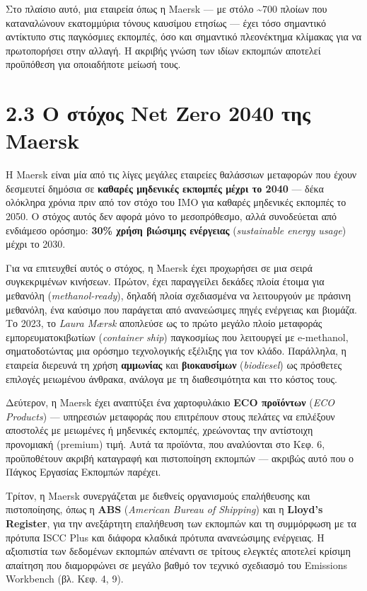 \documentclass[11pt,a4paper,greek,twoside]{template-xe}
\begin{document}
Στο πλαίσιο αυτό, μια εταιρεία όπως η Maersk --- με στόλο
\textasciitilde700 πλοίων που καταναλώνουν εκατομμύρια τόνους καυσίμου
ετησίως --- έχει τόσο σημαντικό αντίκτυπο στις παγκόσμιες εκπομπές, όσο
και σημαντικό πλεονέκτημα κλίμακας για να πρωτοπορήσει στην αλλαγή. Η
ακριβής γνώση των ιδίων εκπομπών αποτελεί προϋπόθεση για οποιαδήποτε
μείωσή τους.

\section{2.3 Ο στόχος Net Zero 2040 της
Maersk}\label{ux3bf-ux3c3ux3c4ux3ccux3c7ux3bfux3c2-net-zero-2040-ux3c4ux3b7ux3c2-maersk}

Η Maersk είναι μία από τις λίγες μεγάλες εταιρείες θαλάσσιων μεταφορών
που έχουν δεσμευτεί δημόσια σε \textbf{καθαρές μηδενικές εκπομπές μέχρι
το 2040} --- δέκα ολόκληρα χρόνια πριν από τον στόχο του IMO για καθαρές
μηδενικές εκπομπές το 2050. Ο στόχος αυτός δεν αφορά μόνο το
μεσοπρόθεσμο, αλλά συνοδεύεται από ενδιάμεσο ορόσημο: \textbf{30\% χρήση
βιώσιμης ενέργειας} (\emph{sustainable energy usage}) μέχρι το 2030.

Για να επιτευχθεί αυτός ο στόχος, η Maersk έχει προχωρήσει σε μια σειρά
συγκεκριμένων κινήσεων. Πρώτον, έχει παραγγείλει δεκάδες πλοία έτοιμα
για μεθανόλη (\emph{methanol-ready}), δηλαδή πλοία σχεδιασμένα να
λειτουργούν με πράσινη μεθανόλη, ένα καύσιμο που παράγεται από
ανανεώσιμες πηγές ενέργειας και βιομάζα. Το 2023, το \emph{Laura Mærsk}
αποπλεύσε ως το πρώτο μεγάλο πλοίο μεταφοράς εμπορευματοκιβωτίων
(\emph{container ship}) παγκοσμίως που λειτουργεί με e-methanol,
σηματοδοτώντας μια ορόσημο τεχνολογικής εξέλιξης για τον κλάδο.
Παράλληλα, η εταιρεία διερευνά τη χρήση \textbf{αμμωνίας} και
\textbf{βιοκαυσίμων} (\emph{biodiesel}) ως πρόσθετες επιλογές μειωμένου
άνθρακα, ανάλογα με τη διαθεσιμότητα και ττο κόστος τους.

Δεύτερον, η Maersk έχει αναπτύξει ένα χαρτοφυλάκιο \textbf{ECO
προϊόντων} (\emph{ECO Products}) --- υπηρεσιών μεταφοράς που επιτρέπουν
στους πελάτες να επιλέξουν αποστολές με μειωμένες ή μηδενικές εκπομπές,
χρεώνοντας την αντίστοιχη προνομιακή (premium) τιμή. Αυτά τα προϊόντα,
που αναλύονται στο Κεφ. 6, προϋποθέτουν ακριβή καταγραφή και πιστοποίηση
εκπομπών --- ακριβώς αυτό που ο Πάγκος Εργασίας Εκπομπών παρέχει.

Τρίτον, η Maersk συνεργάζεται με διεθνείς οργανισμούς επαλήθευσης και
πιστοποίησης, όπως η \textbf{ABS} (\emph{American Bureau of Shipping})
και η \textbf{Lloyd's Register}, για την ανεξάρτητη επαλήθευση των
εκπομπών και τη συμμόρφωση με τα πρότυπα ISCC Plus και διάφορα κλαδικά
πρότυπα ανανεώσιμης ενέργειας. Η αξιοπιστία των δεδομένων εκπομπών
απέναντι σε τρίτους ελεγκτές αποτελεί κρίσιμη απαίτηση που διαμορφώνει
σε μεγάλο βαθμό τον τεχνικό σχεδιασμό του Emissions Workbench (βλ. Κεφ.
4, 9).
\end{document}
